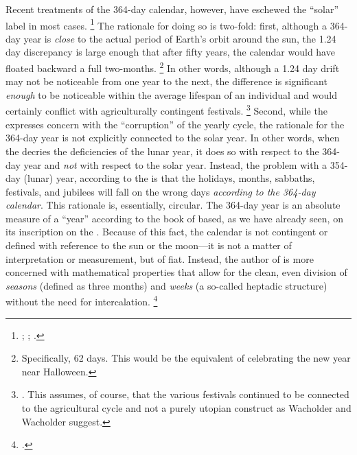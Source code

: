 Recent treatments of the 364-day calendar, however, have eschewed the ``solar'' label in most cases.%
    \footnote{%
        \cite[231]{glessmer_flint-vanderkam1999};
        \cite[80]{bendov_steele2011};
        \cite[438]{jacobus_brooke-hempel2018}.}
The rationale for doing so is two-fold: first, although a 364-day year is \emph{close} to the actual period of Earth's orbit around the sun, the 1.24 day discrepancy is large enough that after fifty years, the calendar would have floated backward a full two-months.%
    \footnote{Specifically, 62 days. This would be the equivalent of celebrating the new year near Halloween.}
In other words, although a 1.24 day drift may not be noticeable from one year to the next, the difference is significant \emph{enough} to be noticeable within the average lifespan of an individual and would certainly conflict with agriculturally contingent festivals.%
    \footnote{\Cite[28--37]{wacholder-wacholder_huca1995}. This assumes, of course, that the various festivals continued to be connected to the agricultural cycle and not a purely utopian construct as Wacholder and Wacholder suggest.}
Second, while the \ap expresses concern with the ``corruption'' of the yearly cycle, the rationale for the 364-day year is not explicitly connected to the solar year. In other words, when the \ap decries the deficiencies of the lunar year, it does so with respect to the 364-day year and \emph{not} with respect to the solar year. Instead, the problem with a 354-day (lunar) year, according to the \ap is that the holidays, months, sabbaths, festivals, and jubilees will fall on the wrong days \emph{according to the 364-day calendar}. This rationale is, essentially, circular. The 364-day year is an absolute measure of a ``year'' according to the book of \jub based, as we have already seen, on its inscription on the \HT. Because of this fact, the calendar is not contingent or defined with reference to the sun or the moon---it is not a matter of interpretation or measurement, but of fiat. Instead, the author of \jub is more concerned with mathematical properties that allow for the clean, even division of \emph{seasons} (defined as three months) and \emph{weeks} (a so-called heptadic structure) without the need for intercalation.%
    \footnote{\Cite[125]{bendov-saulnier_cbr2008}.}

